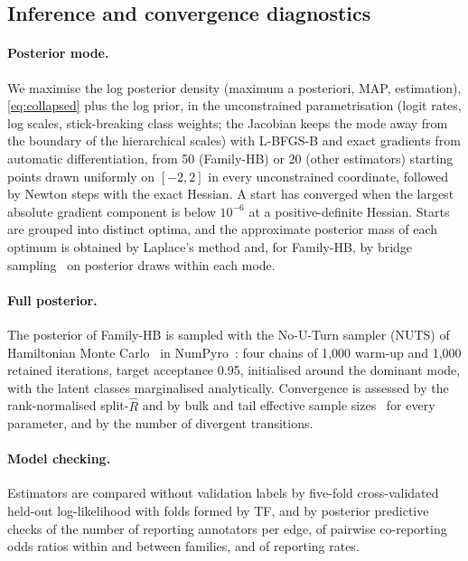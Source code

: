 \documentclass[11pt,a4paper]{article}
\begin{document}
\subsection{Inference and convergence diagnostics}\label{sec:inference}
\paragraph{Posterior mode.} We maximise the log posterior density (maximum a posteriori, MAP, estimation), \eqref{eq:collapsed} plus the log prior, in the unconstrained parametrisation (logit rates, log scales, stick-breaking class weights; the Jacobian keeps the mode away from the boundary of the hierarchical scales) with L-BFGS-B and exact gradients from automatic differentiation, from 50 (Family-HB) or 20 (other estimators) starting points drawn uniformly on $[-2,2]$ in every unconstrained coordinate, followed by Newton steps with the exact Hessian. A start has converged when the largest absolute gradient component is below \ensuremath{10^{-6}} at a positive-definite Hessian. Starts are grouped into distinct optima, and the approximate posterior mass of each optimum is obtained by Laplace's method and, for Family-HB, by bridge sampling~\citep{meng1996simulating,gronau2017tutorial} on posterior draws within each mode.

\paragraph{Full posterior.} The posterior of Family-HB is sampled with the No-U-Turn sampler (NUTS) of Hamiltonian Monte Carlo~\citep{hoffman2014nuts} in NumPyro~\citep{phan2019numpyro}: four chains of 1{,}000 warm-up and 1{,}000 retained iterations, target acceptance 0.95, initialised around the dominant mode, with the latent classes marginalised analytically. Convergence is assessed by the rank-normalised split-$\widehat{R}$ and by bulk and tail effective sample sizes~\citep{vehtari2021rank} for every parameter, and by the number of divergent transitions.

\paragraph{Model checking.} Estimators are compared without validation labels by five-fold cross-validated held-out log-likelihood with folds formed by TF, and by posterior predictive checks of the number of reporting annotators per edge, of pairwise co-reporting odds ratios within and between families, and of reporting rates.
\end{document}

